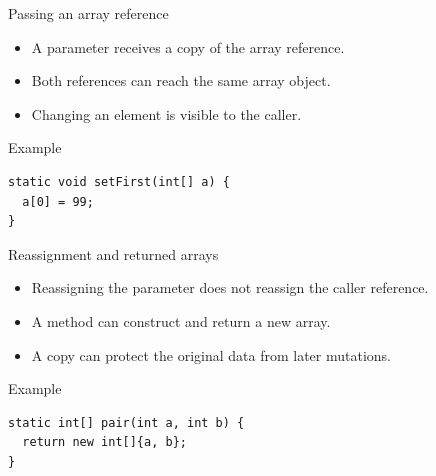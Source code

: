 \documentclass[10pt,aspectratio=169]{beamer}
\begin{document}
\begin{frame}[fragile,t]{Passing an array reference}
\begin{itemize}
\item A parameter receives a copy of the array reference.
\item Both references can reach the same array object.
\item Changing an element is visible to the caller.
\end{itemize}
\vspace{1mm}\begin{block}{Example}
\begin{lstlisting}
static void setFirst(int[] a) {
  a[0] = 99;
}
\end{lstlisting}
\end{block}
\end{frame}

\begin{frame}[fragile,t]{Reassignment and returned arrays}
\begin{itemize}
\item Reassigning the parameter does not reassign the caller reference.
\item A method can construct and return a new array.
\item A copy can protect the original data from later mutations.
\end{itemize}
\vspace{1mm}\begin{block}{Example}
\begin{lstlisting}
static int[] pair(int a, int b) {
  return new int[]{a, b};
}
\end{lstlisting}
\end{block}
\end{frame}
\end{document}
